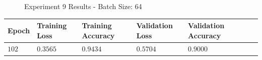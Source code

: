 \documentclass[11pt,a4paper]{article}
\begin{document}
\begin{figure}[H]
    \caption{Experiment 9 Results - Batch Size: 64}
\end{figure}
\begin{center}
\hspace*{-0.8cm}
\begin{tabular}{|p{1.2cm}|p{1.8cm}|p{2cm}|p{2cm}|p{2cm}|p{2cm}|p{2cm}|}
\rowcolor{gray!50}
\hline
\textbf{Epoch} & \textbf{Training Loss} & \textbf{Training Accuracy} & \textbf{Validation Loss} & \textbf{Validation Accuracy}\\
\hline
$102$ & $0.3565$ & $0.9434$ & $0.5704$ & $0.9000$\\
\hline
\end{tabular}\\
\end{center}
\end{document}
